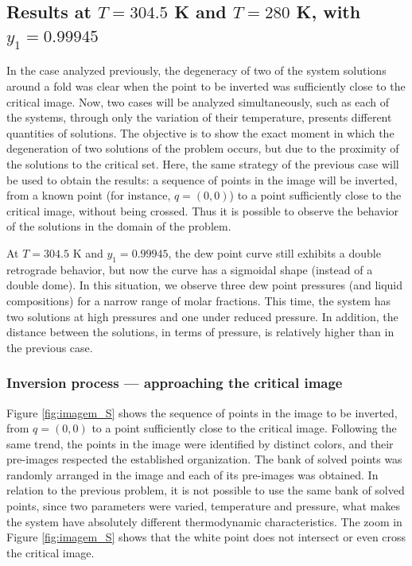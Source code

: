 \documentclass[journal=iecred,manuscript=article]{achemso}
\theoremstyle{definition}
\theoremstyle{remark}
\begin{document}
\subsection{Results at $ T = 304.5 $ K and $ T = 280 $ K, with $ y_1 = 0.99945 $}

In the case analyzed previously, the degeneracy of two of the system solutions around a fold was clear when the point to be inverted was sufficiently close to the critical image. Now, two cases will be analyzed simultaneously, such as each of the systems, through only the variation of their temperature, presents different quantities of solutions. The objective is to show the exact moment in which the degeneration of two solutions of the problem occurs, but due to the proximity of the solutions to the critical set. Here, the same strategy of the previous case will be used to obtain the results: a sequence of points in the image will be inverted, from a known point (for instance, $ q = \left(0, 0\right) $) to a point sufficiently close to the critical image, without being crossed. Thus it is possible to observe the behavior of the solutions in the domain of the problem.

At $T = 304.5$ K and $y_1 = 0.99945$, the dew point curve still exhibits a double retrograde behavior, but now the curve has a sigmoidal shape (instead of a double dome). In this situation, we observe three dew point pressures (and liquid compositions) for a narrow range of molar fractions. This time, the system has two solutions at high pressures and one under reduced pressure. In addition, the distance between the solutions, in terms of pressure, is relatively higher than in the previous case.

\subsubsection{Inversion process --- approaching  the critical image}

Figure \ref{fig:imagem_S} shows the sequence of points in the image to be inverted, from $ q = \left(0, 0\right) $ to a point sufficiently close to the critical image. Following the same trend, the points in the image were identified by distinct colors, and their pre-images respected the established organization. The bank of solved points was randomly arranged in the image and each of its pre-images was obtained. In relation to the previous problem, it is not possible to use the same bank of solved points, since two parameters were varied, temperature and pressure, what makes the system have absolutely different thermodynamic characteristics. The zoom in Figure \ref{fig:imagem_S} shows that the white point does not intersect or even cross the critical image.
\end{document}
